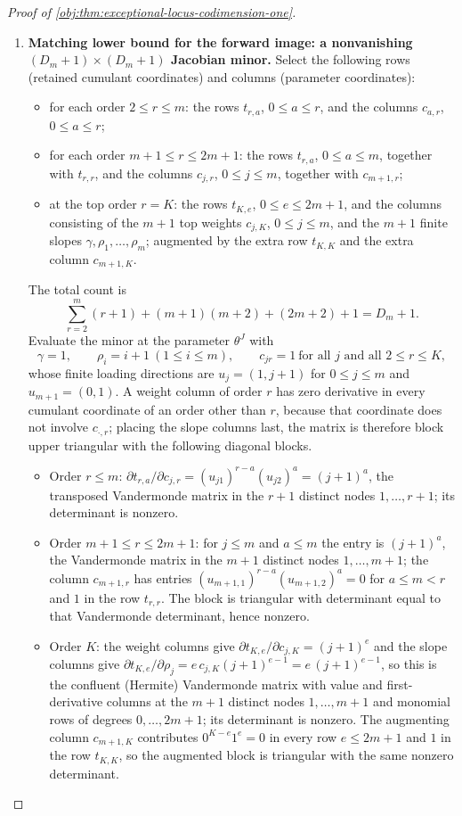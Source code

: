\begin{proof}[Proof of \cref{obj:thm:exceptional-locus-codimension-one}]
\begin{enumerate}
\item \textbf{Matching lower bound for the forward image: a nonvanishing \((D_m+1)\times(D_m+1)\) Jacobian minor.}  Select the following rows (retained cumulant coordinates) and columns (parameter coordinates):
\begin{itemize}
\item for each order \(2\le r\le m\): the rows \(t_{r,a}\), \(0\le a\le r\), and the columns \(c_{a,r}\), \(0\le a\le r\);
\item for each order \(m+1\le r\le 2m+1\): the rows \(t_{r,a}\), \(0\le a\le m\), together with \(t_{r,r}\), and the columns \(c_{j,r}\), \(0\le j\le m\), together with \(c_{m+1,r}\);
\item at the top order \(r=K\): the rows \(t_{K,e}\), \(0\le e\le 2m+1\), and the columns consisting of the \(m+1\) top weights \(c_{j,K}\), \(0\le j\le m\), and the \(m+1\) finite slopes \(\gamma,\rho_1,\ldots,\rho_m\); augmented by the extra row \(t_{K,K}\) and the extra column \(c_{m+1,K}\).
\end{itemize}
The total count is
\[
\sum_{r=2}^{m}(r+1)+(m+1)(m+2)+(2m+2)+1=D_m+1 .
\]
Evaluate the minor at the parameter \(\theta^{J}\) with
\[
\gamma=1,\qquad \rho_i=i+1\ (1\le i\le m),\qquad c_{jr}=1\ \text{for all }j\text{ and all }2\le r\le K,
\]
whose finite loading directions are \(u_j=(1,j+1)\) for \(0\le j\le m\) and \(u_{m+1}=(0,1)\).  A weight column of order \(r\) has zero derivative in every cumulant coordinate of an order other than \(r\), because that coordinate does not involve \(c_{\cdot,r}\); placing the slope columns last, the matrix is therefore block upper triangular with the following diagonal blocks.
\begin{itemize}
\item Order \(r\le m\): \(\partial t_{r,a}/\partial c_{j,r}=(u_{j1})^{r-a}(u_{j2})^{a}=(j+1)^{a}\), the transposed Vandermonde matrix in the \(r+1\) distinct nodes \(1,\ldots,r+1\); its determinant is nonzero.
\item Order \(m+1\le r\le 2m+1\): for \(j\le m\) and \(a\le m\) the entry is \((j+1)^{a}\), the Vandermonde matrix in the \(m+1\) distinct nodes \(1,\ldots,m+1\); the column \(c_{m+1,r}\) has entries \((u_{m+1,1})^{r-a}(u_{m+1,2})^{a}=0\) for \(a\le m<r\) and \(1\) in the row \(t_{r,r}\).  The block is triangular with determinant equal to that Vandermonde determinant, hence nonzero.
\item Order \(K\): the weight columns give \(\partial t_{K,e}/\partial c_{j,K}=(j+1)^{e}\) and the slope columns give \(\partial t_{K,e}/\partial\rho_j=e\,c_{j,K}(j+1)^{e-1}=e\,(j+1)^{e-1}\), so this is the confluent (Hermite) Vandermonde matrix with value and first-derivative columns at the \(m+1\) distinct nodes \(1,\ldots,m+1\) and monomial rows of degrees \(0,\ldots,2m+1\); its determinant is nonzero.  The augmenting column \(c_{m+1,K}\) contributes \(0^{K-e}1^{e}=0\) in every row \(e\le 2m+1\) and \(1\) in the row \(t_{K,K}\), so the augmented block is triangular with the same nonzero determinant.

\end{itemize}
\end{enumerate}
\end{proof}
